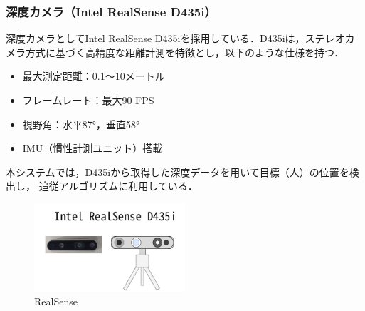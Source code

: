 \subsubsection{深度カメラ（Intel RealSense D435i）}
深度カメラとしてIntel RealSense D435iを採用している．D435iは，ステレオカメラ方式に基づく高精度な距離計測を特徴とし，以下のような仕様を持つ．
\begin{itemize}
    \item 最大測定距離：0.1～10メートル
    \item フレームレート：最大90 FPS
    \item 視野角：水平87°，垂直58°
    \item IMU（慣性計測ユニット）搭載
\end{itemize}
本システムでは，D435iから取得した深度データを用いて目標（人）の位置を検出し，
追従アルゴリズムに利用している．

\begin{figure}[H]
    \centering
    \includegraphics[width=0.5\textwidth]{figure/RealSense.pdf}
    \caption{RealSense}
    \label{fig:RealSense}
\end{figure}

